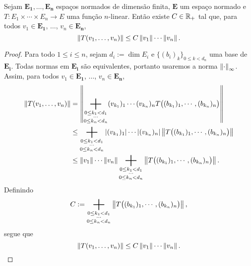 \begin{prop}
Sejam $\bm{E_1},\dots,\bm{E_n}$ espaços normados de dimensão finita, $\bm{E}$ um espaço normado e $T: E_1 \times \cdots \times E_n \to E$ uma função $n$-linear. Então existe $C \in \mathbb{R}_+$ tal que, para todos $v_1 \in \bm{E_1}$, $\ldots$, $v_n \in \bm{E_n}$,
	\begin{equation*}
	\left\Vert{T(v_1,\ldots,v_n)}\right\Vert \leq C\left\Vert{v_1}\right\Vert\cdots\left\Vert{v_n}\right\Vert.
	\end{equation*}
\end{prop}
\begin{proof}
Para todo $1 \leq i \leq n$, sejam $d_i := \dim E_i$ e $\{(b_i)_k\}_{0\leq k<{d_n}}$ uma base de $\bm{E_i}$. Todas normas em $\bm{E_i}$ são equivalentes, portanto usaremos a norma $\left\Vert{\cdot}\right\Vert_\infty$. Assim, para todos $v_1 \in \bm{E_1}$, $\ldots$, $v_n \in \bm{E_n}$,
	\begin{align*}
	\nor{T(v_1,\ldots,v_n)} &= \nor{\bigplus_{\substack{0 \leq k_1 < d_1\\\cdots\\0\leq k_n< d_n}} (v_{k_1})_1\cdots(v_{k_n})_nT\big((b_{k_1})_1,\cdots,(b_{k_n})_n\big)} \\
		&\leq \bigplus_{\substack{0 \leq k_1 < d_1\\\cdots\\0\leq k_n< d_n}} \abs{(v_{k_1})_1}\cdots\abs{(v_{k_n})_n}\nor{T\big((b_{k_1})_1,\cdots,(b_{k_n})_n\big)} \\
		&\leq \nor{v_1}\cdots\nor{v_n}\bigplus_{\substack{0 \leq k_1 < d_1\\\cdots\\0\leq k_n< d_n}} \nor{T\big((b_{k_1})_1,\cdots,(b_{k_n})_n\big)}.
	\end{align*}
Definindo
	\begin{equation*}
	C := \bigplus_{\substack{0 \leq k_1 < d_1\\\cdots\\0\leq k_n< d_n}}  \nor{T\big((b_{k_1})_1,\cdots,(b_{k_n})_n\big)},
	\end{equation*}
segue que
	\begin{equation*}
	\left\Vert{T(v_1,\ldots,v_n)}\right\Vert \leq C \left\Vert{v_1}\right\Vert\cdots\left\Vert{v_n}\right\Vert.
	\end{equation*}
\end{proof}



























